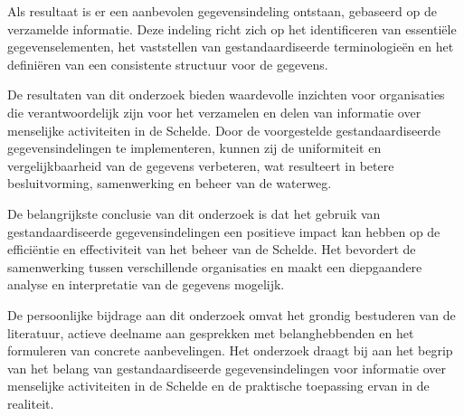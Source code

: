 Als resultaat is er een aanbevolen gegevensindeling ontstaan, gebaseerd op de verzamelde informatie. Deze indeling richt zich op het identificeren van essentiële gegevenselementen, het vaststellen van gestandaardiseerde terminologieën en het definiëren van een consistente structuur voor de gegevens.

De resultaten van dit onderzoek bieden waardevolle inzichten voor organisaties die verantwoordelijk zijn voor het verzamelen en delen van informatie over menselijke activiteiten in de Schelde. Door de voorgestelde gestandaardiseerde gegevensindelingen te implementeren, kunnen zij de uniformiteit en vergelijkbaarheid van de gegevens verbeteren, wat resulteert in betere besluitvorming, samenwerking en beheer van de waterweg.

De belangrijkste conclusie van dit onderzoek is dat het gebruik van gestandaardiseerde gegevensindelingen een positieve impact kan hebben op de efficiëntie en effectiviteit van het beheer van de Schelde. Het bevordert de samenwerking tussen verschillende organisaties en maakt een diepgaandere analyse en interpretatie van de gegevens mogelijk.

De persoonlijke bijdrage aan dit onderzoek omvat het grondig bestuderen van de literatuur, actieve deelname aan gesprekken met belanghebbenden en het formuleren van concrete aanbevelingen. Het onderzoek draagt bij aan het begrip van het belang van gestandaardiseerde gegevensindelingen voor informatie over menselijke activiteiten in de Schelde en de praktische toepassing ervan in de realiteit.

